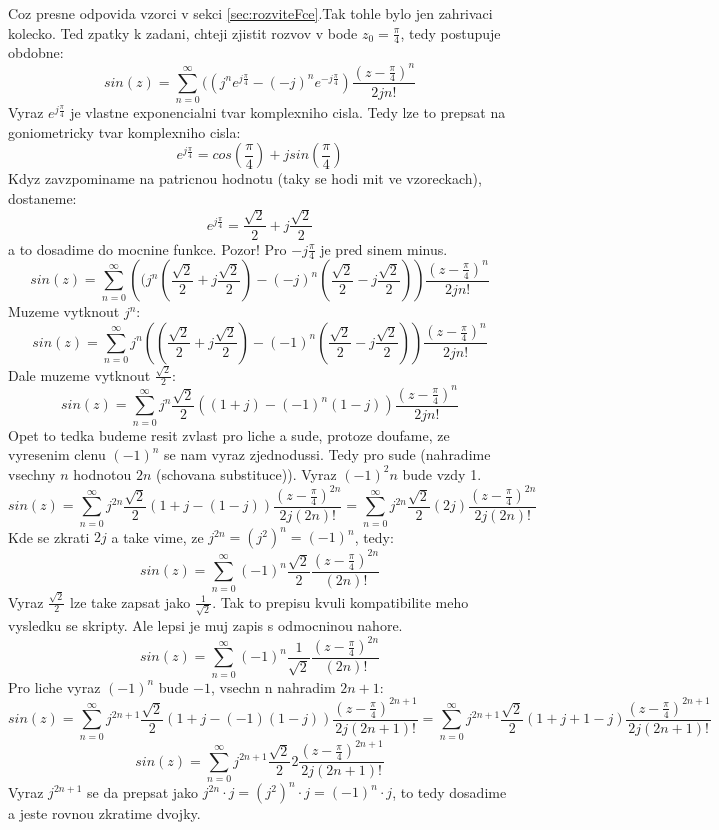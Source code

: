 Coz presne odpovida vzorci v sekci \ref{sec:rozviteFce}.Tak tohle bylo jen zahrivaci kolecko. Ted zpatky k zadani, chteji zjistit rozvov v bode $z_0 = \frac{\pi}{4}$, tedy postupuje obdobne:
$$sin(z) = \sum_{n=0}^\infty ((j^n e^{j\frac{\pi}{4}} -(-j)^{n}e^{-j\frac{\pi}{4}})\frac{(z-\frac{\pi}{4})^n}{2jn!}$$
Vyraz $e^{j\frac{\pi}{4}}$ je vlastne exponencialni tvar komplexniho cisla. Tedy lze to prepsat na goniometricky tvar komplexniho cisla:
$$e^{j\frac{\pi}{4}} = cos(\frac{\pi}{4})+jsin(\frac{\pi}{4})$$
Kdyz zavzpominame na patricnou hodnotu (taky se hodi mit ve vzoreckach), dostaneme:
$$e^{j\frac{\pi}{4}} = \frac{\sqrt{2}}{2} + j \frac{\sqrt{2}}{2}$$
a to dosadime do mocnine funkce. Pozor! Pro $-j\frac{\pi}{4}$ je pred sinem minus.
$$sin(z) = \sum_{n=0}^\infty \left((j^n (\frac{\sqrt{2}}{2} + j \frac{\sqrt{2}}{2}) -(-j)^{n}(\frac{\sqrt{2}}{2} - j \frac{\sqrt{2}}{2})\right)\frac{(z-\frac{\pi}{4})^n}{2jn!}$$
Muzeme vytknout $j^n$:
$$sin(z) = \sum_{n=0}^\infty j^n \left((\frac{\sqrt{2}}{2} + j \frac{\sqrt{2}}{2}) -(-1)^{n}(\frac{\sqrt{2}}{2} - j \frac{\sqrt{2}}{2})\right)\frac{(z-\frac{\pi}{4})^n}{2jn!}$$
Dale muzeme vytknout $\frac{\sqrt{2}}{2}$:
$$sin(z) = \sum_{n=0}^\infty j^n \frac{\sqrt{2}}{2} \left((1 + j) -(-1)^{n}(1 - j)\right)\frac{(z-\frac{\pi}{4})^n}{2jn!}$$
Opet to tedka budeme resit zvlast pro liche a sude, protoze doufame, ze vyresenim clenu $(-1)^n$ se nam vyraz zjednodussi. Tedy pro sude (nahradime vsechny $n$ hodnotou $2n$ (schovana substituce)). Vyraz $(-1)^2n$ bude vzdy 1.
$$sin(z) = \sum_{n=0}^\infty j^{2n} \frac{\sqrt{2}}{2} \left(1 + j -(1 - j)\right)\frac{(z-\frac{\pi}{4})^{2n}}{2j(2n)!} = \sum_{n=0}^\infty j^{2n} \frac{\sqrt{2}}{2} \left(2j\right)\frac{(z-\frac{\pi}{4})^{2n}}{2j(2n)!}$$
Kde se zkrati $2j$ a take vime, ze $j^{2n} = (j^2)^n = (-1)^n$, tedy:
$$sin(z) = \sum_{n=0}^\infty (-1)^{n} \frac{\sqrt{2}}{2}\frac{(z-\frac{\pi}{4})^{2n}}{(2n)!}$$
Vyraz $\frac{\sqrt{2}}{2}$ lze take zapsat jako $\frac{1}{\sqrt{2}}$. Tak to prepisu kvuli kompatibilite meho vysledku se skripty. Ale lepsi je muj zapis s odmocninou nahore.
$$sin(z) = \sum_{n=0}^\infty (-1)^{n} \frac{1}{\sqrt{2}}\frac{(z-\frac{\pi}{4})^{2n}}{(2n)!}$$
Pro liche vyraz $(-1)^n$ bude $-1$, vsechn n nahradim $2n+1$:
$$sin(z) = \sum_{n=0}^\infty j^{2n+1} \frac{\sqrt{2}}{2} \left(1 + j -(-1)(1 - j)\right)\frac{(z-\frac{\pi}{4})^{2n+1}}{2j(2n+1)!} = \sum_{n=0}^\infty j^{2n+1} \frac{\sqrt{2}}{2} \left(1 + j + 1 - j\right)\frac{(z-\frac{\pi}{4})^{2n+1}}{2j(2n+1)!}$$
$$sin(z) = \sum_{n=0}^\infty j^{2n+1} \frac{\sqrt{2}}{2} 2 \frac{(z-\frac{\pi}{4})^{2n+1}}{2j(2n+1)!}$$
Vyraz $j^{2n+1}$ se da prepsat jako $j^{2n}\cdot j = (j^2)^n \cdot j = (-1)^n \cdot j$, to tedy dosadime a jeste rovnou zkratime dvojky.
